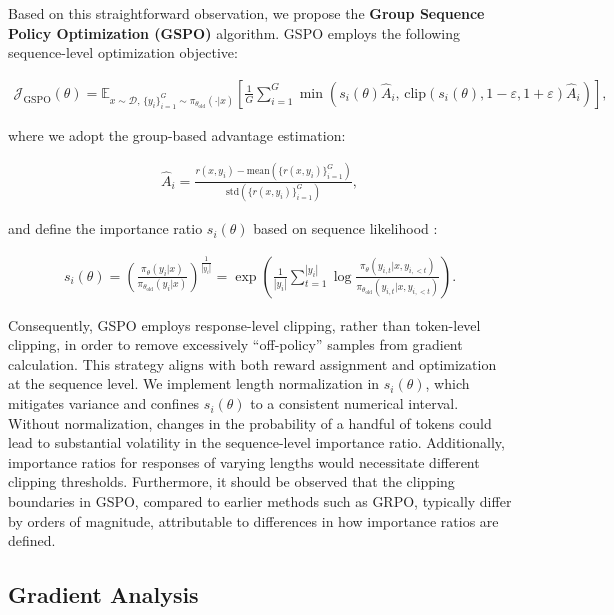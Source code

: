 Based on this straightforward observation, we propose the \textbf{Group Sequence Policy Optimization (GSPO)} algorithm. GSPO employs the following sequence-level optimization objective:

\begin{align}
\mathcal{J}_\text{GSPO} (\theta) =
\mathbb{E}_{ x \sim \mathcal{D},\, \{y_i\}_{i=1}^G \sim \pi_{\theta_\text{old}}( \cdot | x) }
\left[ 
\frac{1}{G} \sum_{i=1}^{G}
\min \left( s_{i}(\theta)  \widehat{A}_{i},  \, \mathrm{clip} \left( s_{i}(\theta), 1 - {\varepsilon}, 1 + {\varepsilon} \right) \widehat{A}_{i} \right) 
\right],
\label{equ:gspo}
\end{align}

where we adopt the group-based advantage estimation:

\begin{align}
\widehat{A}_{i} = \frac{r(x, y_i) - \mathrm{mean} \left( \{ r(x, y_i) \}_{i=1}^G \right) }{ \mathrm{std} \left( \{ r(x, y_i) \}_{i=1}^G \right) },
\end{align}

and define the importance ratio $s_{i}(\theta)$ based on sequence likelihood \citep{click}:

\begin{align}
s_{i}(\theta) = \left( \frac{ \pi_{\theta} (y_i | x) }{ \pi_{\theta_\text{old}} (y_i | x)} \right)^{\frac{1}{|y_i|}}
=
\exp \left( \frac{1}{|y_i|} \sum_{t=1}^{|y_i|} \log \frac{ \pi_{\theta} (y_{i,t} | x, y_{i,<t}) }{ \pi_{\theta_\text{old}} (y_{i,t} | x,y_{i,<t})} \right).
\end{align}

Consequently, GSPO employs response-level clipping, rather than token-level clipping, in order to remove excessively ``off-policy'' samples from gradient calculation. This strategy aligns with both reward assignment and optimization at the sequence level. We implement length normalization in $s_{i}(\theta)$, which mitigates variance and confines $s_{i}(\theta)$ to a consistent numerical interval. Without normalization, changes in the probability of a handful of tokens could lead to substantial volatility in the sequence-level importance ratio. Additionally, importance ratios for responses of varying lengths would necessitate different clipping thresholds. Furthermore, it should be observed that the clipping boundaries in GSPO, compared to earlier methods such as GRPO, typically differ by orders of magnitude, attributable to differences in how importance ratios are defined.

\subsection{Gradient Analysis}
\label{subsec:gradient}

